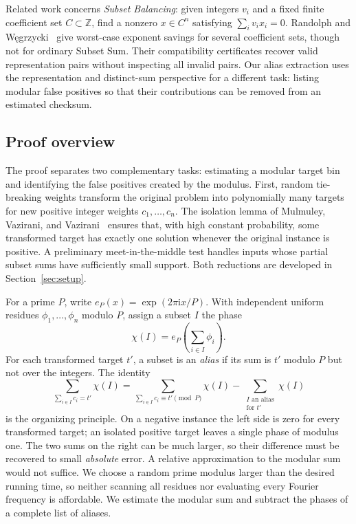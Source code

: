Related work concerns \emph{Subset Balancing}: given integers $v_i$
and a fixed finite coefficient set $C\subset\mathbb Z$, find a nonzero
$x\in C^n$ satisfying $\sum_i v_ix_i=0$.
Randolph and W\k{e}grzycki~\cite{RandolphWegrzycki2026} give worst-case
exponent savings for several coefficient sets, though not for ordinary
Subset Sum.  Their compatibility certificates recover valid
representation pairs without inspecting all invalid pairs.
Our alias extraction uses the representation and distinct-sum
perspective for a different task: listing modular false positives so
that their contributions can be removed from an estimated checksum.

\subsection{Proof overview}

The proof separates two complementary tasks:
estimating a modular target bin and identifying the false positives
created by the modulus.  First, random tie-breaking weights transform
the original problem into polynomially many targets for new positive
integer weights $c_1,\ldots,c_n$.  The isolation lemma of Mulmuley,
Vazirani, and Vazirani~\cite{MVV1987} ensures that, with high constant
probability, some transformed target has exactly one solution whenever
the original instance is positive.  A preliminary meet-in-the-middle
test handles inputs whose partial subset sums have sufficiently small
support.  Both reductions are developed in Section~\ref{sec:setup}.

For a prime $P$, write $e_P(x)=\exp(2\pi\mathrm i x/P)$.
With independent uniform residues
$\phi_1,\ldots,\phi_n$ modulo $P$, assign a subset $I$ the phase
\[
 \chi(I)=e_P\left(\sum_{i\in I}\phi_i\right).
\]
For each transformed target $t'$, a subset is an \emph{alias} if its
sum is $t'$ modulo $P$ but not over the integers.  The identity
\begin{equation}\label{eq:overview-subtraction}
 \sum_{\sum_{i\in I}c_i=t'}\chi(I)
  =\sum_{\sum_{i\in I}c_i\equiv t'\pmod P}\chi(I)
     -\sum_{\substack{I\text{ an alias}\\\text{for }t'}}\chi(I)
\end{equation}
is the organizing principle.  On a negative instance the left side is
zero for every transformed target; an isolated positive target leaves
a single phase of modulus one.  The two sums on the right can be much
larger, so their difference must be recovered to small \emph{absolute}
error.  A relative approximation to the modular sum would not suffice.
We choose a random prime modulus larger than the desired running time,
so neither scanning all residues nor evaluating every Fourier frequency
is affordable.  We estimate the modular sum and subtract the phases of
a complete list of aliases.

